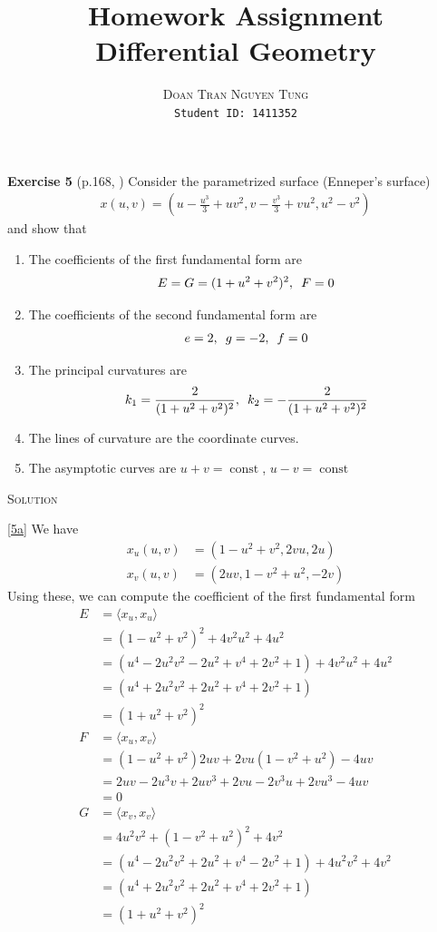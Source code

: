 \documentclass[a4paper]{report}
\title{\Huge Homework Assignment\\Differential Geometry}
\author{\textsc{Doan Tran Nguyen Tung}\\
{\small \texttt{Student ID: 1411352}}}
\DeclareMathOperator{\const}{const}
\begin{document}
\maketitle
\textbf{Exercise 5} (p.168, \cite{2}) Consider the parametrized surface (Enneper's surface)
\begin{align}
	x(u,v) = \left(u - \frac{u^3}{3} + u v^2, v - \frac{v^3}{3} + v u^2, u^2 - v^2\right)
\end{align}
and show that
\begin{enumerate}[label=\textbf{(\alph*)}, leftmargin=*]
	\item\label{5a} The coefficients of the first fundamental form are
	\begin{align}
		E = G = (1+u^2 + v^2)^2, \enskip F = 0
	\end{align}
	\item\label{5b} The coefficients of the second fundamental form are
	\begin{align}
		e = 2, \enskip g = -2, \enskip f = 0
	\end{align}
	\item\label{5c} The principal curvatures are 
	\begin{align}
		k_1 = \frac{2}{(1+u^2+v^2)^2}, \enskip k_2 = -\frac{2}{(1+u^2+v^2)^2}
	\end{align}
	\item\label{5d} The lines of curvature are the coordinate curves. 
	\item\label{5e} The asymptotic curves are $u+v= \const$, $u - v = \const$
\end{enumerate}
\textsc{Solution} 

\ref{5a} We have
\begin{align}
	x_u(u,v) &= \left(1 - u^2 + v^2, 2vu, 2u \right)\\
	x_v(u,v) &= \left(2uv, 1 - v^2 + u^2, -2v \right)
\end{align}
Using these, we can compute the coefficient of the first fundamental form
\begin{align}
	E &= \langle x_u, x_u \rangle\\
	&= (1 - u^2 + v^2)^2 + 4v^2u^2 + 4u^2 \\
	&= (u^4 - 2u^2v^2 - 2u^2 + v^4 + 2v^2 + 1) + 4v^2u^2 + 4u^2\\
	&= (u^4 + 2u^2v^2 + 2u^2 + v^4 + 2v^2 + 1) \\
	&= (1+u^2 + v^2)^2\\
	F &= \langle x_u, x_v \rangle \\
	&= (1 - u^2 + v^2)2uv + 2vu(1 - v^2 + u^2) - 4uv\\
	&= 2uv - 2u^3v + 2uv^3 + 2vu - 2v^3u + 2vu^3 - 4uv\\
	&= 0 \\
	G &= \langle x_v, x_v \rangle \\
	&= 4u^2v^2 + (1 - v^2 + u^2)^2 + 4v^2\\
	&= (u^4 - 2u^2v^2 + 2u^2 + v^4 - 2v^2 + 1) + 4u^2v^2 + 4v^2\\
	&= (u^4 + 2u^2v^2 + 2u^2 + v^4 + 2v^2 + 1) \\
	&= (1+u^2 + v^2)^2
\end{align}
\end{document}
